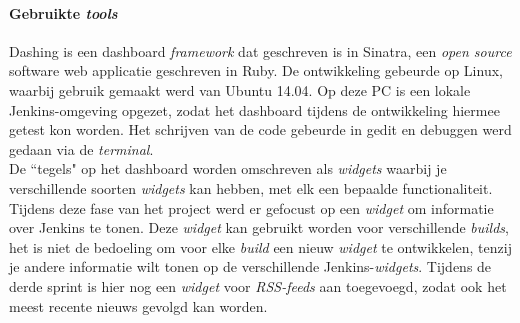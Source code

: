 \documentclass[10pt,a4paper]{article}
\begin{document}
\paragraph{Gebruikte \textit{tools}}
Dashing is een dashboard \textit{framework} dat geschreven is in Sinatra, een \textit{open source} software web applicatie geschreven in Ruby. De ontwikkeling gebeurde op Linux, waarbij gebruik gemaakt werd van Ubuntu 14.04. Op deze PC is een lokale Jenkins-omgeving opgezet, zodat het dashboard tijdens de ontwikkeling hiermee getest kon worden. Het schrijven van de code gebeurde in gedit en debuggen werd gedaan via de \textit{terminal}.\\
De ``tegels" op het dashboard worden omschreven als \textit{widgets} waarbij je verschillende soorten \textit{widgets} kan hebben, met elk een bepaalde functionaliteit. Tijdens deze fase van het project werd er gefocust op een \textit{widget} om informatie over Jenkins te tonen. Deze \textit{widget} kan gebruikt worden voor verschillende \textit{builds}, het is niet de bedoeling om voor elke \textit{build} een nieuw \textit{widget} te ontwikkelen, tenzij je andere informatie wilt tonen op de verschillende Jenkins-\textit{widgets}. Tijdens de derde sprint is hier nog een \textit{widget} voor \textit{RSS-feeds} aan toegevoegd, zodat ook het meest recente nieuws gevolgd kan worden.
\end{document}
